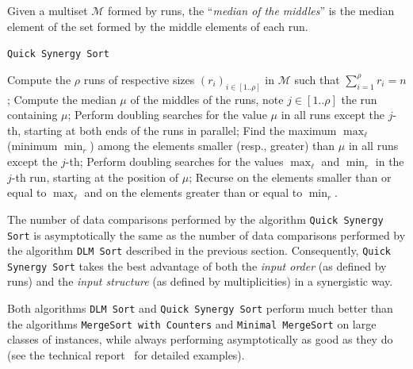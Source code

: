 \begin{INUTILE}
  \begin{definition}
    Given a multiset $\mathcal{M}$ formed by runs, the ``\emph{median
      of the middles}'' is the median element of the set formed by the
    middle elements of each run.
  \end{definition}
\end{INUTILE}
\begin{algorithm} %
  \caption{\texttt{Quick Synergy Sort}} %
  \label{alg:qss} %
  \begin{algorithmic}[1] %

     

    \STATE Compute the $\rho$ runs of respective sizes
    $(r_i)_{i\in[1..\rho]}$ in $\mathcal{M}$ such that
    $\sum^{\rho}_{i=1} r_i = n$;
    \STATE Compute the median $\mu$ of
    the middles of the runs, note $j\in[1..\rho]$ the run containing
    $\mu$;
    \STATE Perform doubling searches for the value $\mu$ in all
    runs except the $j$-th, starting at both ends of the runs in
    parallel;
    \STATE Find the maximum $\max_\ell$ (minimum $\min_r$)
    among the elements smaller (resp., greater) than $\mu$ in all runs
    except the $j$-th;
    \STATE Perform doubling searches for the values
    $\max_\ell$ and $\min_r$ in the $j$-th run, starting at the
    position of $\mu$;
    \STATE Recurse on the elements smaller than or
    equal to $\max_\ell$ and on the elements greater than or equal to
    $\min_r$.
  \end{algorithmic}
\end{algorithm}

The number of data comparisons performed by the algorithm
\texttt{Quick Synergy Sort} is asymptotically the same as the number
of data comparisons performed by the algorithm \texttt{DLM Sort}
described in the previous section. Consequently, \texttt{Quick Synergy
  Sort} takes the best advantage of both the \emph{input order} (as
defined by runs) and the \emph{input structure} (as defined by
multiplicities) in a synergistic way.

Both algorithms \texttt{DLM Sort} and \texttt{Quick Synergy Sort}
perform much better than the algorithms \texttt{MergeSort with
  Counters} and \texttt{Minimal MergeSort} on large classes of
instances, while always performing asymptotically as good as they do (see the technical
report~\cite{2016-ARXIV-SynergisticSortingAndDeferredDataStructuresOnMultiSets-BarbayOchoaSatty}
for detailed examples).

